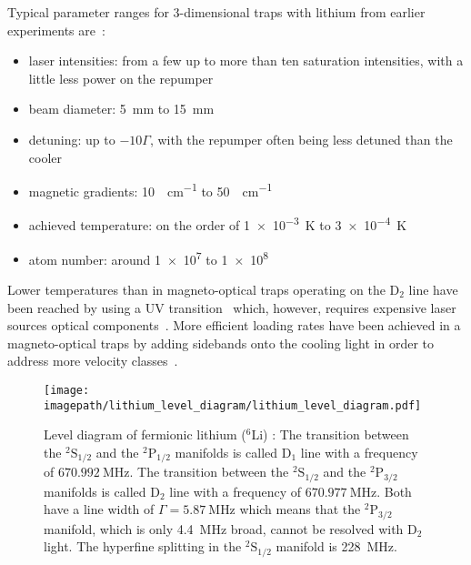 Typical parameter ranges for 3-dimensional traps with lithium from earlier experiments are~\cite{
    tiecke_high-flux_2009,
    kawanaka_decay_1993,
    schunemann_magneto-optic_1998,
    mewes_simultaneous_1999,
    hilker_laser_2012,
    kerkmann_novel_2019,
    ladouceur_compact_2009,
    chen_lithium-cesium_2021,    
    burchianti_efficient_2014,
    li_enhanced_2015,
}:
\begin{itemize}
    \item laser intensities: from a few up to more than ten saturation intensities, with a little less power on the repumper
    \item beam diameter: \SI{5}{\milli\meter} to \SI{15}{\milli\meter}
    \item detuning: up to $-10 \Gamma$, with the repumper often being less detuned than the cooler
    \item magnetic gradients: \SI{10}{\gauss\per\centi\meter} to \SI{50}{\gauss\per\centi\meter}
    \item achieved temperature: on the order of \SI{1e-3}{\kelvin} to \SI{3e-4}{\kelvin}
    \item atom number: around \SI{1e7}{} to \SI{1e8}{}
\end{itemize}

Lower temperatures than in magneto-optical traps operating on the D$_2$ line have been reached by using a UV transition~\cite{duarte_all-optical_2011,omran_microscopic_2015} which, however, requires expensive laser sources optical components~\cite{burchianti_efficient_2014}. More efficient loading rates have been achieved in a magneto-optical traps by adding sidebands onto the cooling light in order to address more velocity classes~\cite{li_enhanced_2015}.


\begin{figure}
    \centering
    \texttt{[image: \\imagepath/lithium\_level\_diagram/lithium\_level\_diagram.pdf]}
    \caption{Level diagram of fermionic lithium ($^6$Li) \cite{gehm_properties_2003}: The transition between the  $^2\text{S}_{1/2}$ and the $^2\text{P}_{1/2}$ manifolds is called D$_1$ line with a frequency of $\SI{670.992}{\mega\hertz}$. The transition between the  $^2\text{S}_{1/2}$ and the $^2\text{P}_{3/2}$ manifolds is called D$_2$ line with a frequency of $\SI{670.977}{\mega\hertz}$. Both have a line width of $\Gamma = \SI{5.87}{\mega\hertz}$ which means that the $^2\text{P}_{3/2}$ manifold, which is only \SI{4.4}{\mega\hertz} broad, cannot be resolved with D$_2$ light. The hyperfine splitting in the $^2\text{S}_{1/2}$ manifold is \SI{228}{\mega\hertz}.}
    \label{fig:lithium_level_diagram}
\end{figure}

